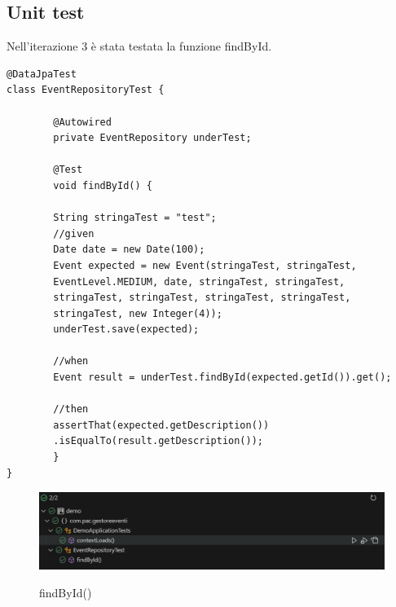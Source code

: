 \subsection{Unit test}
Nell'iterazione 3 è stata testata la funzione findById.

\begin{lstlisting}
@DataJpaTest
class EventRepositoryTest {

        @Autowired
        private EventRepository underTest;

        @Test
        void findById() {

        String stringaTest = "test";
        //given
        Date date = new Date(100);
        Event expected = new Event(stringaTest, stringaTest, 
        EventLevel.MEDIUM, date, stringaTest, stringaTest, 
        stringaTest, stringaTest, stringaTest, stringaTest, 
        stringaTest, new Integer(4));
        underTest.save(expected);

        //when
        Event result = underTest.findById(expected.getId()).get();

        //then
        assertThat(expected.getDescription())
        .isEqualTo(result.getDescription());
        }
}
\end{lstlisting}

\begin{figure}[h!]
\begin{center}

  \includegraphics[width=16cm]{Iterazione 2/test/unit test/unit.PNG}\\
  \caption{findById()}
\end{center}
\end{figure}
